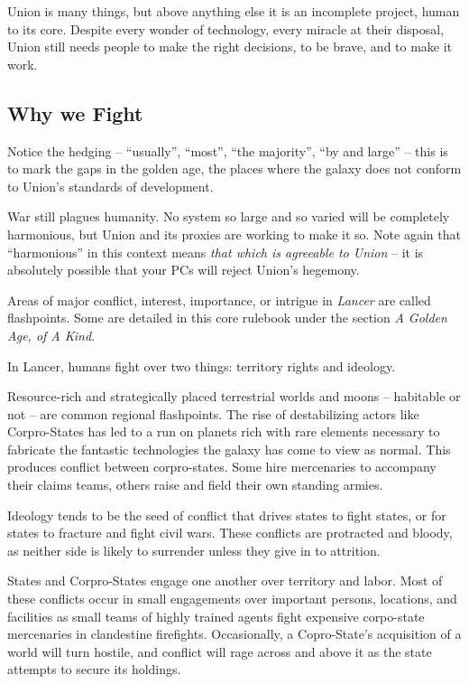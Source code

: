 Union is many things, but above anything else it is an incomplete project, human to its core.
Despite every wonder of technology, every miracle at their disposal, Union still needs people to
make the right decisions, to be brave, and to make it work.

\subsection{Why we Fight}

Notice the hedging -- ``usually'', ``most'', ``the majority'', ``by and large'' -- this is to mark the gaps
in the golden age, the places where the galaxy does not conform to Union’s standards of
development.

War still plagues humanity. No system so large and so varied will be completely harmonious, but
Union and its proxies are working to make it so. Note again that ``harmonious'' in this context
means \textit{that which is agreeable to Union} -- it is absolutely possible that your PCs will reject
Union’s hegemony.

Areas of major conflict, interest, importance, or intrigue in \textit{Lancer} are called flashpoints. Some
are detailed in this core rulebook under the section \textit{A Golden Age, of A Kind}.

In Lancer, humans fight over two things: territory rights and ideology.

Resource-rich and strategically placed terrestrial worlds and moons -- habitable or not -- are
common regional flashpoints. The rise of destabilizing actors like Corpro-States has led to a run
on planets rich with rare elements necessary to fabricate the fantastic technologies the galaxy
has come to view as normal. This produces conflict between corpro-states. Some hire
mercenaries to accompany their claims teams, others raise and field their own standing armies.

Ideology tends to be the seed of conflict that drives states to fight states, or for states to fracture
and fight civil wars. These conflicts are protracted and bloody, as neither side is likely to
surrender unless they give in to attrition.

States and Corpro-States engage one another over territory and labor. Most of these conflicts
occur in small engagements over important persons, locations, and facilities as small teams of
highly trained agents fight expensive corpo-state mercenaries in clandestine firefights.
Occasionally, a Copro-State’s acquisition of a world will turn hostile, and conflict will rage across
and above it as the state attempts to secure its holdings.